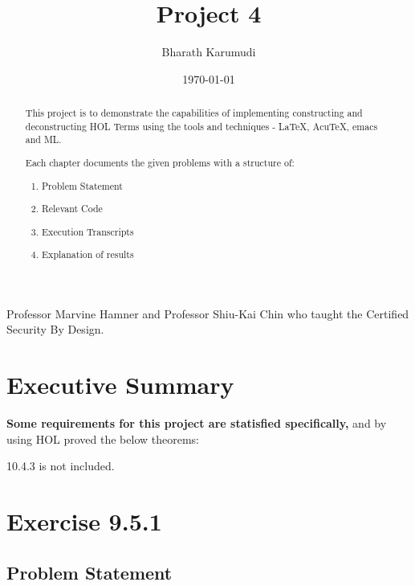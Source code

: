 \documentclass{report}
\title{Project 4}
\author{Bharath Karumudi}
\date{\today}
\begin{document}
 \lstset{language=ML}
 \maketitle{}

 \begin{abstract}
   This project is to demonstrate the capabilities of implementing
   constructing and deconstructing HOL Terms using the tools and
   techniques - \LaTeX{}, AcuTeX, emacs and ML. 

   Each chapter documents the given problems with a structure of:
   \begin{enumerate}
   \item Problem Statement
   \item Relevant Code
   \item Execution Transcripts
   \item Explanation of results
   \end{enumerate}

 \end{abstract}


 \begin{acknowledgments}
  Professor Marvine Hamner and Professor Shiu-Kai Chin who taught the
  Certified Security By Design.
 \end{acknowledgments}

 \tableofcontents{}

 \chapter{Executive Summary}
 \label{cha:executive-summary}

\textbf{Some requirements for this project are statisfied specifically,}
 and by using HOL proved the below theorems:
\begin{quote}
\HOLexerciseNineTheorems
\HOLexerciseOneZeroTheorems
\end{quote}
10.4.3 is not included.


 \chapter{Exercise 9.5.1}
 \label{cha:exercise-9.5.1}
  
 \section{Problem Statement}
 \label{sec:problem-statement-1}
\end{document}
